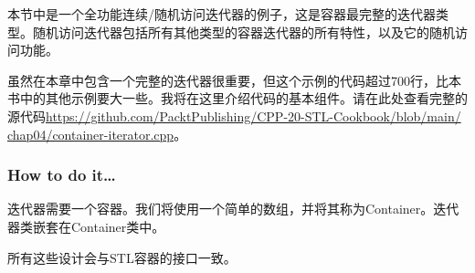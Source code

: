 
本节中是一个全功能连续/随机访问迭代器的例子，这是容器最完整的迭代器类型。随机访问迭代器包括所有其他类型的容器迭代器的所有特性，以及它的随机访问功能。

虽然在本章中包含一个完整的迭代器很重要，但这个示例的代码超过700行，比本书中的其他示例要大一些。我将在这里介绍代码的基本组件。请在此处查看完整的源代码\url{https://github.com/PacktPublishing/CPP-20-STL-Cookbook/blob/main/ chap04/container-iterator.cpp}。


\subsubsection{How to do it…}

迭代器需要一个容器。我们将使用一个简单的数组，并将其称为Container。迭代器类嵌套在Container类中。

所有这些设计会与STL容器的接口一致。

